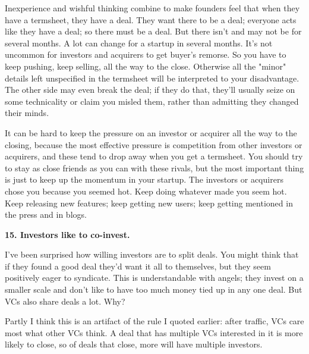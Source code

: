 Inexperience
                  and wishful thinking combine to make founders feel that when
                  they have a termsheet, they have a deal. They want there to be
                  a deal; everyone acts like they have a deal; so there must be
                  a deal. But there isn't and may not be for several months. A
                  lot can change for a startup in several months. It's not
                  uncommon for investors and acquirers to get buyer's remorse.
                  So you have to keep pushing, keep selling, all the way to the
                  close. Otherwise all the "minor" details left unspecified in
                  the termsheet will be interpreted to your disadvantage. The
                  other side may even break the deal; if they do that, they'll
                  usually seize on some technicality or claim you misled them,
                  rather than admitting they changed their minds.

It
                  can be hard to keep the pressure on an investor or acquirer
                  all the way to the closing, because the most effective
                  pressure is competition from other investors or acquirers, and
                  these tend to drop away when you get a termsheet. You should
                  try to stay as close friends as you can with these rivals, but
                  the most important thing is just to keep up the momentum in
                  your startup. The investors or acquirers chose you because you
                  seemed hot. Keep doing whatever made you seem hot. Keep
                  releasing new features; keep getting new users; keep getting
                  mentioned in the press and in blogs.

\textbf{15. Investors like to co-invest.}

I've been surprised how willing investors are to
                  split deals. You might think that if they found a good deal
                  they'd want it all to themselves, but they seem positively
                  eager to syndicate. This is understandable with angels; they
                  invest on a smaller scale and don't like to have too much
                  money tied up in any one deal. But VCs also share deals a lot.
                  Why?

Partly I think this is an artifact of the rule
                  I quoted earlier: after traffic, VCs care most what other VCs
                  think. A deal that has multiple VCs interested in it is more
                  likely to close, so of deals that close, more will have
                  multiple investors.

